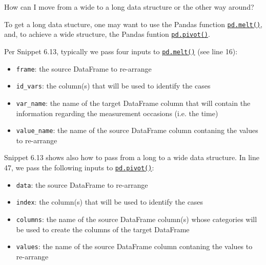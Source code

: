\documentclass[a4paper,11pt]{book}
\numberwithin{figure}{chapter}
\numberwithin{table}{chapter}
\newcommand{\question}[1]{%
    \begin{tcolorbox}[colback=comp_c!10,colframe=comp_c,sidebyside align=top,width=\linewidth,before skip=1ex]
        #1
    \end{tcolorbox}
    \switchcolumn%
}
\newcommand{\note}[1]{%
    \begin{tcolorbox}[colback=white!0,colframe=white!10,width=\linewidth,before skip=1ex]
        #1
    \end{tcolorbox}
}
\begin{document}
\begin{paracol}{2}
	\question{\raggedright How can I move from a wide to a long data structure or the other way around?}
	\note{To get a long data stucture, one may want to use the Pandas function \href{https://pandas.pydata.org/docs/reference/api/pandas.melt.html?highlight=melt#pandas.melt}{\texttt{pd.melt()}}, and, to achieve a wide structure, the Pandas funtion \href{https://pandas.pydata.org/docs/reference/api/pandas.pivot.html?highlight=pivot#pandas.pivot}{\texttt{pd.pivot()}}.

	\quad Per Snippet 6.13, typically we pass four inputs to \href{https://pandas.pydata.org/docs/reference/api/pandas.melt.html?highlight=melt#pandas.melt}{\texttt{pd.melt()}} (see line 16):
	
	\begin{itemize}
		\item  \texttt{frame}: the source DataFrame to re-arrange 
		\item  \texttt{id\_vars}: the column(s) that will be used to identify the cases
		\item  \texttt{var\_name}: the name of the target DataFrame column that will contain the information regarding the measurement occasions (i.e. the time)
		\item  \texttt{value\_name}: the name of the source DataFrame column contaning the values to re-arrange
	\end{itemize}

	\quad Snippet 6.13 shows also how to pass from a long to a wide data structure. In line 47, we pass the following inputs to \href{https://pandas.pydata.org/docs/reference/api/pandas.pivot.html?highlight=pivot#pandas.pivot}{\texttt{pd.pivot()}}:
	
	\begin{itemize}
		\item \texttt{data}: the source DataFrame to re-arrange
		\item \texttt{index}: the column(s) that will be used to identify the cases
		\item \texttt{columns}: the name of the source DataFrame column(s) whose categories will be used to create the columns of the target DataFrame
		\item \texttt{values}: the name of the source DataFrame column contaning the values to re-arrange
	\end{itemize}
	}
\end{paracol}
\end{document}
